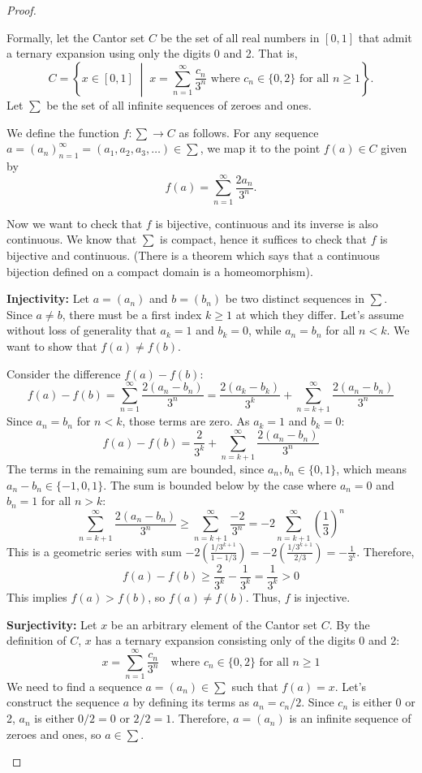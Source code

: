 \documentclass[11pt]{article}
\renewcommand{\_}[1]{\underline{ #1 }}
\theoremstyle{definition}
\numberwithin{equation}{subsection}
\begin{document}
\begin{proof}
\begin{enumerate}
    Formally, let the Cantor set $C$ be the set of all real numbers in $[0, 1]$ that admit a ternary expansion using only the digits 0 and 2. That is,
$$C = \left\{ x \in [0, 1] \;\middle|\; x = \sum_{n=1}^{\infty} \frac{c_n}{3^n} \text{ where } c_n \in \{0, 2\} \text{ for all } n \ge 1 \right\}.$$
Let $\sum$ be the set of all infinite sequences of zeroes and ones.

We define the function $f: \sum \to C$ as follows. For any sequence $a = (a_n)_{n=1}^{\infty} = (a_1, a_2, a_3, \dots) \in \sum$, we map it to the point $f(a) \in C$ given by
$$f(a) = \sum_{n=1}^{\infty} \frac{2a_n}{3^n}.$$

Now we want to check that $f$ is bijective, continuous and its inverse is also continuous. We know that $\sum$ is compact, hence it suffices to check that $f$ is bijective and continuous. (There is a theorem which says that a continuous bijection defined on a compact domain is a homeomorphism).

\textbf{Injectivity:}
Let $a = (a_n)$ and $b = (b_n)$ be two distinct sequences in $\sum$. Since $a \neq b$, there must be a first index $k \ge 1$ at which they differ. Let's assume without loss of generality that $a_k = 1$ and $b_k = 0$, while $a_n = b_n$ for all $n < k$. We want to show that $f(a) \neq f(b)$.

Consider the difference $f(a) - f(b)$:
$$ f(a) - f(b) = \sum_{n=1}^{\infty} \frac{2(a_n - b_n)}{3^n} = \frac{2(a_k - b_k)}{3^k} + \sum_{n=k+1}^{\infty} \frac{2(a_n - b_n)}{3^n} $$
Since $a_n = b_n$ for $n < k$, those terms are zero. As $a_k=1$ and $b_k=0$:
$$ f(a) - f(b) = \frac{2}{3^k} + \sum_{n=k+1}^{\infty} \frac{2(a_n - b_n)}{3^n} $$
The terms in the remaining sum are bounded, since $a_n, b_n \in \{0, 1\}$, which means $a_n - b_n \in \{-1, 0, 1\}$. The sum is bounded below by the case where $a_n=0$ and $b_n=1$ for all $n > k$:
$$ \sum_{n=k+1}^{\infty} \frac{2(a_n - b_n)}{3^n} \ge \sum_{n=k+1}^{\infty} \frac{-2}{3^n} = -2 \sum_{n=k+1}^{\infty} \left(\frac{1}{3}\right)^n $$
This is a geometric series with sum $-2 \left( \frac{1/3^{k+1}}{1 - 1/3} \right) = -2 \left( \frac{1/3^{k+1}}{2/3} \right) = -\frac{1}{3^k}$.
Therefore,
$$ f(a) - f(b) \ge \frac{2}{3^k} - \frac{1}{3^k} = \frac{1}{3^k} > 0 $$
This implies $f(a) > f(b)$, so $f(a) \neq f(b)$. Thus, $f$ is injective.

\textbf{Surjectivity:}
Let $x$ be an arbitrary element of the Cantor set $C$. By the definition of $C$, $x$ has a ternary expansion consisting only of the digits 0 and 2:
$$ x = \sum_{n=1}^{\infty} \frac{c_n}{3^n} \quad \text{where } c_n \in \{0, 2\} \text{ for all } n \ge 1 $$
We need to find a sequence $a = (a_n) \in \sum$ such that $f(a) = x$.
Let's construct the sequence $a$ by defining its terms as $a_n = c_n / 2$.
Since $c_n$ is either 0 or 2, $a_n$ is either $0/2=0$ or $2/2=1$. Therefore, $a = (a_n)$ is an infinite sequence of zeroes and ones, so $a \in \sum$.


\end{enumerate}
\end{proof}
\end{document}
